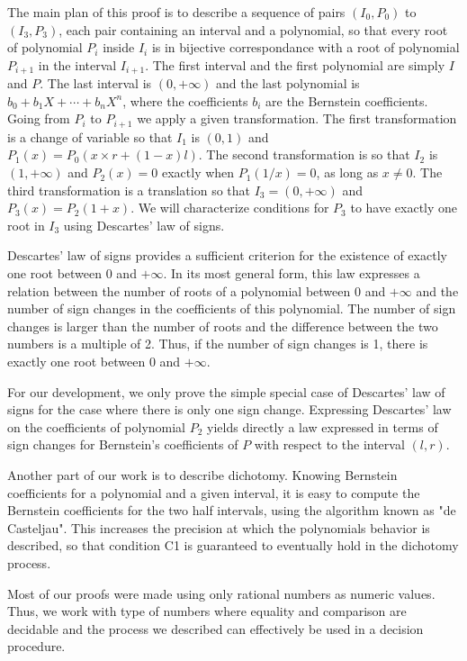 \documentclass{mscs}
\begin{document}
The main plan of this proof is to describe a sequence of pairs
\((I_0, P_0)\) to \((I_3, P_3)\), each pair containing an interval
and a polynomial, so that every root of polynomial \(P_i\) inside
\(I_i\) is in bijective correspondance with a root of polynomial \(P_{i+1}\)
in the interval \(I_{i+1}\).  The first interval and the first polynomial
are simply \(I\) and \(P\).  The last interval is \((0, +\infty)\) and
the last polynomial is \(b_0 + b_1 X + \cdots + b_n X^n\), where
the coefficients \(b_i\) are the Bernstein coefficients.  Going from
\(P_i\) to \(P_{i+1}\) we apply a given transformation.  The first
transformation is a change of variable so that \(I_1\) is \((0,1)\) and
\(P_1(x) = P_0(x \times r + (1 - x) l)\).  The second transformation is so
that \(I_2\) is \((1,+\infty)\) and \(P_2(x) = 0\) exactly when
\(P_1(1/x) = 0\), as long as \(x\neq 0\).  The third transformation is a
translation so that \(I_3 = (0,+\infty)\) and \(P_3(x) = P_2(1+x)\).
We will characterize conditions for \(P_3\) to have exactly one root in
\(I_3\) using Descartes' law of signs.

Descartes' law of signs provides a sufficient criterion for the
existence of exactly one root between 0 and \(+\infty\).  In its
most general form, this law
expresses a relation between the number of roots of a polynomial
between 0 and \(+\infty\) and the number of sign changes in the
coefficients of this polynomial.  The number of sign changes is larger
than the number of roots and the difference between the two numbers is
a multiple of 2.  Thus, if the number of sign changes is 1, there is
exactly one root between 0 and \(+\infty\).

For our development, we only prove the simple special case of
Descartes' law of signs for the case where there is only one sign
change.  Expressing Descartes' law on the coefficients of polynomial
\(P_2\) yields directly a law expressed in terms of sign changes for
Bernstein's coefficients of \(P\) with respect to the interval
\((l,r)\).

Another part of our work is to describe dichotomy.  Knowing Bernstein
coefficients for a polynomial and a given interval, it is easy to
compute the Bernstein coefficients for the two half intervals, using
the algorithm known as "de Casteljau".  This increases the precision
at which the polynomials behavior is described, so that condition C1
is guaranteed to eventually hold in the dichotomy process.

Most of our proofs were made using only rational numbers as numeric
values.  Thus, we work with type of numbers where equality and
comparison are decidable and the process we described can effectively
be used in a decision procedure.
\end{document}

